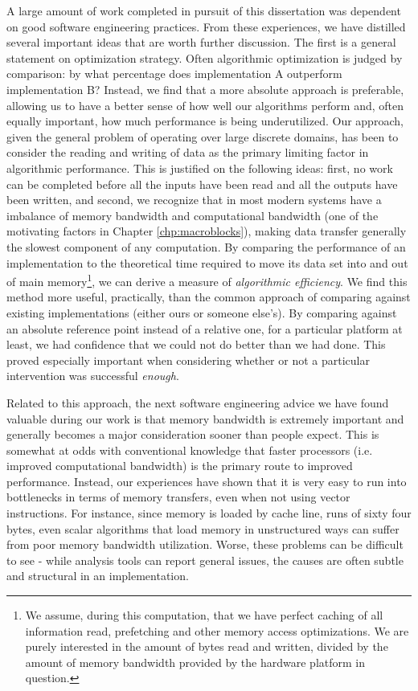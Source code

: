 A large amount of work completed in pursuit of this dissertation was
dependent on good software engineering practices. From these
experiences, we have distilled several important ideas that are worth
further discussion. The first is a general statement on optimization
strategy. Often algorithmic optimization is judged by comparison: by
what percentage does implementation A outperform implementation B? Instead, we
find that a more absolute approach is preferable, allowing us to have
a better sense of how well our algorithms perform and, often equally
important, how much performance is being underutilized. Our approach,
given the general problem of operating over large discrete domains,
has been to consider the reading and writing of data as the primary
limiting factor in algorithmic performance. This is justified on the
following ideas: first, no work can be completed before all the inputs
have been read and all the outputs have been written, and second, we
recognize that in most modern systems have a imbalance of memory
bandwidth and computational bandwidth (one of the motivating factors
in Chapter \ref{chp:macroblocks}), making data transfer generally the
slowest component of any computation. By comparing the performance of
an implementation to the theoretical time required to move its data
set into and out of main memory\footnote{We assume, during this
  computation, that we have perfect caching of all information read,
  prefetching and other memory access optimizations. We are purely
  interested in the amount of bytes read and written, divided by the
  amount of memory bandwidth provided by the hardware platform in
  question.}, we can derive a measure of \textit{algorithmic
  efficiency}. We find this method more useful, practically, than the
common approach of comparing against existing implementations (either
ours or someone else's). By comparing against an absolute reference
point instead of a relative one, for a particular platform at least,
we had confidence that we could not do better than we had done. This
proved especially important when considering whether or not a
particular intervention was successful \textit{enough}.

Related to this approach, the next software engineering advice we have
found valuable during our work is that memory bandwidth is extremely
important and generally becomes a major consideration sooner than
people expect. This is somewhat at odds with conventional knowledge
that faster processors (i.e. improved computational bandwidth) is the
primary route to improved performance. Instead, our experiences have
shown that it is very easy to run into bottlenecks in terms of memory
transfers, even when not using vector instructions. For instance,
since memory is loaded by cache line, runs of sixty four bytes,
even scalar algorithms that load memory in unstructured ways can
suffer from poor memory bandwidth utilization. Worse, these problems
can be difficult to see - while analysis tools can report general
issues, the causes are often subtle and structural in an implementation.  

